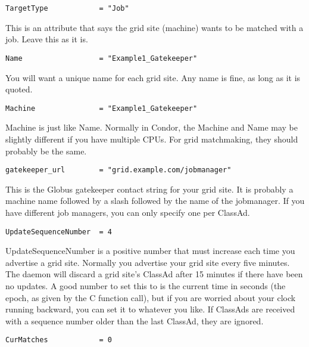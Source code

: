 \begin{verbatim}
TargetType            = "Job"
\end{verbatim}

This is an attribute that says the grid site (machine) wants to be
matched with a job. Leave this as it is. 


\footnotesize
\begin{verbatim}
Name                  = "Example1_Gatekeeper"
\end{verbatim}
\normalsize

You will want a unique name for each grid site. Any name is fine, as long as
it is quoted.

\footnotesize
\begin{verbatim}
Machine               = "Example1_Gatekeeper"
\end{verbatim}
\normalsize

Machine is just like Name. Normally in Condor, the Machine and Name
may be slightly different if you have multiple CPUs. For grid
matchmaking, they should probably be the same.

\footnotesize
\begin{verbatim}
gatekeeper_url        = "grid.example.com/jobmanager"
\end{verbatim}
\normalsize

This is the Globus gatekeeper contact string for your grid site. It is
probably a machine name followed by a slash followed by the name of
the jobmanager. If you have different job managers, you can only
specify one per ClassAd. 

\begin{verbatim}
UpdateSequenceNumber  = 4
\end{verbatim}

UpdateSequenceNumber is a positive number that must increase each time
you advertise a grid site. Normally you advertise your grid site
every five minutes. The  daemon will discard a grid site's
ClassAd after 15 minutes if there have been no updates. A good number
to set this to is the current time in seconds (the epoch, as given by
the C  function call), but if you are worried about your clock
running backward, you can set it to whatever you like. If ClassAds are
received with a sequence number older than the last ClassAd, they are
ignored. 

\begin{verbatim}
CurMatches            = 0
\end{verbatim}


